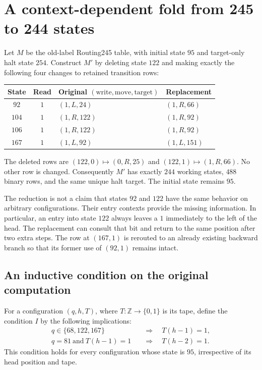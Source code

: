 \section{A context-dependent fold from 245 to 244 states}
\label{sec:contextual-fold}

Let $M$ be the old-label Routing245 table, with initial state $95$ and
target-only halt state $254$.  Construct $M'$ by deleting state $122$ and
making exactly the following four changes to retained transition rows:
\begin{center}
\begin{tabular}{ccll}
\hline
State & Read & Original $(\text{write},\text{move},\text{target})$
                 & Replacement\\
\hline
$92$  & $1$ & $(1,L,24)$  & $(1,R,66)$\\
$104$ & $1$ & $(1,R,122)$ & $(1,R,92)$\\
$106$ & $1$ & $(1,R,122)$ & $(1,R,92)$\\
$167$ & $1$ & $(1,L,92)$  & $(1,L,151)$\\
\hline
\end{tabular}
\end{center}
The deleted rows are $(122,0)\mapsto(0,R,25)$ and
$(122,1)\mapsto(1,R,66)$.  No other row is changed.
Consequently $M'$ has exactly $244$ working states, $488$ binary rows, and
the same unique halt target.  The initial state remains $95$.

The reduction is not a claim that states $92$ and $122$ have the same
behavior on arbitrary configurations.  Their entry contexts provide the
missing information.  In particular, an entry into state $122$ always
leaves a $1$ immediately to the left of the head.  The replacement can
consult that bit and return to the same position after two extra steps.
The row at $(167,1)$ is rerouted to an already existing backward branch so
that its former use of $(92,1)$ remains intact.

\subsection{An inductive condition on the original computation}

For a configuration $(q,h,T)$, where $T:\mathbb Z\to\{0,1\}$ is its tape,
define the condition $I$ by the following implications:
\[
\begin{aligned}
 q\in\{68,122,167\}&\quad\Longrightarrow\quad T(h-1)=1,\\
 q=81\ \text{and}\ T(h-1)=1
     &\quad\Longrightarrow\quad T(h-2)=1.
\end{aligned}
\]
This condition holds for every configuration whose state is $95$,
irrespective of its head position and tape.

